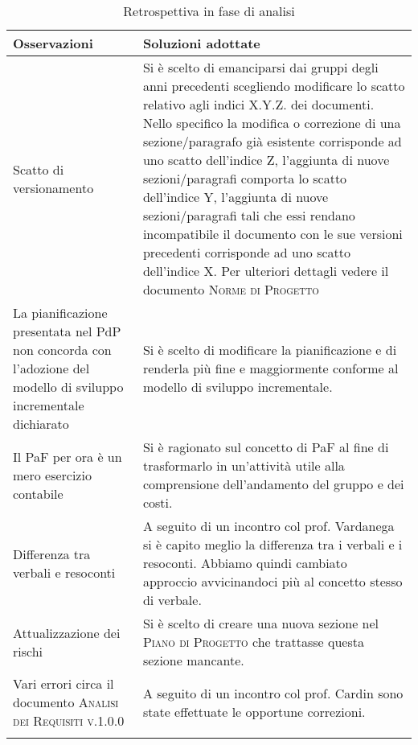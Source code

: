\documentclass[../piano_di_qualifica.tex]{subfiles}
\begin{document}
\begin{center}
	\begin{longtable}{|p{5cm}|p{10cm}|}
		\hline
		\rowcolor{lightgray}
		\textbf{Osservazioni} & \textbf{Soluzioni adottate} \\
		\hline

		Scatto di versionamento & Si è scelto di emanciparsi dai gruppi degli anni precedenti scegliendo modificare	lo scatto relativo agli indici X.Y.Z. dei documenti. Nello specifico la modifica o correzione di una sezione/paragrafo già esistente corrisponde ad uno scatto dell'indice Z, l'aggiunta di nuove sezioni/paragrafi comporta lo scatto dell'indice Y, l'aggiunta di nuove sezioni/paragrafi tali che essi rendano incompatibile il documento con le sue versioni precedenti corrisponde ad uno scatto dell'indice X. Per ulteriori dettagli vedere il documento \textsc{Norme di Progetto} \\
		La pianificazione presentata nel PdP non concorda con l’adozione del modello di sviluppo incrementale dichiarato & Si è scelto di modificare la pianificazione e di renderla più fine e maggiormente conforme al modello di sviluppo incrementale. \\
		Il PaF per ora è un mero esercizio contabile & Si è ragionato sul concetto di PaF al fine di trasformarlo in un'attività utile alla comprensione dell'andamento del gruppo e dei costi. \\
		Differenza tra verbali e resoconti & A seguito di un incontro col prof. Vardanega si è capito meglio la differenza tra i verbali e i resoconti. Abbiamo quindi cambiato approccio avvicinandoci più al concetto stesso di verbale. \\
		Attualizzazione dei rischi & Si è scelto di creare una nuova sezione nel \textsc{Piano di Progetto} che trattasse questa sezione mancante. \\
		Vari errori circa il documento \textsc{Analisi dei Requisiti v.1.0.0} & A seguito di un incontro col prof. Cardin sono state effettuate le opportune correzioni. \\

		\hline
		\rowcolor{white}
		\caption{Retrospettiva in fase di analisi}
	\end{longtable}
\end{center}
\end{document}
